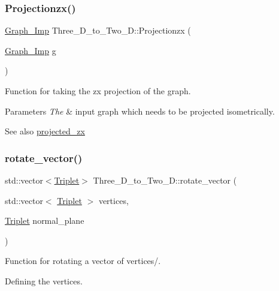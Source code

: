\subsubsection{\texorpdfstring{Projectionzx()}{Projectionzx()}}
{\footnotesize\ttfamily \mbox{\hyperlink{class_graph___imp}{Graph\+\_\+\+Imp}} Three\+\_\+\+D\+\_\+to\+\_\+\+Two\+\_\+\+D\+::\+Projectionzx (\begin{DoxyParamCaption}\item[{\mbox{\hyperlink{class_graph___imp}{Graph\+\_\+\+Imp}}}]{g }\end{DoxyParamCaption})}



Function for taking the zx projection of the graph. 


\begin{DoxyParams}{Parameters}
{\em The} & input graph which needs to be projected isometrically. \\
\hline
\end{DoxyParams}
\begin{DoxySeeAlso}{See also}
\mbox{\hyperlink{class_three___d__to___two___d_af1026f5bd3bf034cb40be96c6ec1889a}{projected\+\_\+zx}} 
\end{DoxySeeAlso}
\mbox{\label{class_three___d__to___two___d_a59038023694a3c5e9c87a1483b712f48}} 
\subsubsection{\texorpdfstring{rotate\+\_\+vector()}{rotate\_vector()}}
{\footnotesize\ttfamily std\+::vector$<$\mbox{\hyperlink{struct_triplet}{Triplet}}$>$ Three\+\_\+\+D\+\_\+to\+\_\+\+Two\+\_\+\+D\+::rotate\+\_\+vector (\begin{DoxyParamCaption}\item[{std\+::vector$<$ \mbox{\hyperlink{struct_triplet}{Triplet}} $>$}]{vertices,  }\item[{\mbox{\hyperlink{struct_triplet}{Triplet}}}]{normal\+\_\+plane }\end{DoxyParamCaption})}



Function for rotating a vector of vertices/. 

Defining the vertices. \mbox{\label{class_three___d__to___two___d_a21796ec5910d031e28c4eb3674528050}} 
